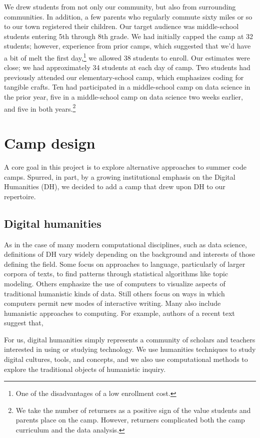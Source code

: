 We drew students from not only our community, but also from
surrounding communities.  In addition, a few parents who regularly
commute sixty miles or so to our town registered their children.  Our
target audience was middle-school students entering 5th through 8th grade.
We had initially capped the camp at 32 students; however, experience
from prior camps, which suggested that we'd have a bit of melt the
first day,\footnote{One of the disadvantages of a low enrollment cost.}
we allowed 38 students to enroll.  Our estimates were close;
we had approximately 34 students at each day of camp.  Two students
had previously attended our elementary-school camp, which emphasizes
coding for tangible crafts.  Ten had participated in a middle-school
camp on data science in the prior year, five in
a middle-school camp on data science two weeks earlier, and five
in both years.\footnote{We take the number of returners
as a positive sign of the value students and parents place on the camp.
However, returners complicated both the camp curriculum and the
data analysis.}  

\section{Camp design}

A core goal in this project is to explore alternative approaches
to summer code camps.  Spurred, in part, by a growing institutional
emphasis on the Digital Humanities (DH), we decided to add a camp that
drew upon DH to our repertoire.

\subsection{Digital humanities}

As in the case of many modern computational disciplines, such as
data science, definitions of DH vary widely
depending on the background and interests of those defining the
field.  Some focus on approaches to language, particularly of larger
corpora of texts, to find patterns through statistical algorithms
like topic modeling.  Others emphasize the use of computers to
visualize aspects of traditional humanistic kinds of data.  Still
others focus on ways in which computers permit new modes of interactive
writing.  Many also include humanistic approaches to computing.
For example, authors of a recent text suggest that,
\begin{blockquote}
For us, digital humanities simply represents a community of scholars and teachers interested in using or studying technology. We use humanities techniques to study digital cultures, tools, and concepts, and we also use computational methods to explore the traditional objects of humanistic inquiry. \cite{Battershill2017}
\end{blockquote}

